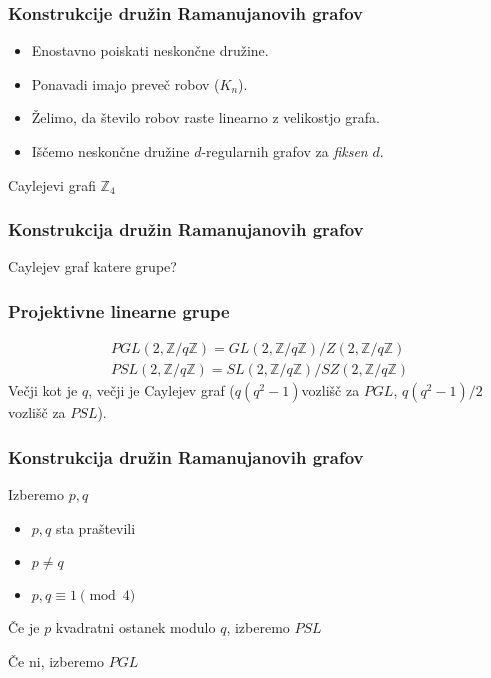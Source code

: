 \documentclass{beamer}
\begin{document}
\begin{frame}
    \frametitle{Konstrukcije družin Ramanujanovih grafov}
    \begin{itemize}
        \item Enostavno poiskati neskončne družine.
        \item Ponavadi imajo preveč robov (\(K_n\)). \pause
        \item Želimo, da število robov raste linearno z velikostjo grafa.
        \item Iščemo neskončne družine \(d\)-regularnih grafov za \emph{fiksen} \(d\).
    \end{itemize}
\end{frame}
\begin{frame}{Caylejevi grafi \(\mathbb Z_4\)}
\end{frame}
\begin{frame}
    \frametitle{Konstrukcija družin Ramanujanovih grafov}
    Caylejev graf katere grupe?
\end{frame}
\begin{frame}
    \frametitle{Projektivne linearne grupe}
    \begin{align*}
        PGL(2, \mathbb Z / q\mathbb Z) = GL(2, \mathbb Z / q\mathbb Z) / Z(2, \mathbb Z / q\mathbb Z) \\
        PSL(2, \mathbb Z / q\mathbb Z) = SL(2, \mathbb Z / q\mathbb Z) / SZ(2, \mathbb Z / q\mathbb Z)
    \end{align*}
    Večji kot je \(q\), večji je Caylejev graf (\(q(q^2-1)\)vozlišč za \(PGL\), \(q(q^2-1)/2\) vozlišč za \(PSL\)).
\end{frame}
\begin{frame}
    \frametitle{Konstrukcija družin Ramanujanovih grafov}
    Izberemo \(p,q\)
    \begin{itemize}
        \item \(p,q\) sta praštevili
        \item \(p\neq q\)
        \item \(p,q \equiv 1\pmod 4\)
    \end{itemize}
    Če je \(p\) kvadratni ostanek modulo \(q\), izberemo \(PSL\)

    Če ni, izberemo \(PGL\)
\end{frame}
\end{document}

